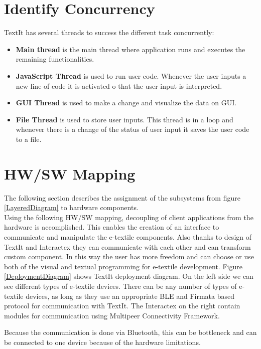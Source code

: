 \section{Identify Concurrency}
TextIt has several threads to success the different task concurrently:
\begin{itemize}
\item \textbf{Main thread} is the main thread where application runs and executes the remaining functionalities. 
\item \textbf{JavaScript Thread} is used to run user code. Whenever the user inputs a new line of code it is activated o that the user input is interpreted. 
\item \textbf{GUI Thread} is used to make a change and visualize the data on GUI.
\item \textbf{File Thread} is used to store user inputs. This thread is in a loop and whenever there is a change of the status of user input it saves the user code to a file.
\end{itemize}


\section{HW/SW Mapping}
The following section describes the assignment of the subsystems from figure \ref{LayeredDiagram} to hardware components. \\

Using the following HW/SW mapping, decoupling of client applications from the hardware is accomplished. This enables the creation of an interface to communicate and manipulate the e-textile components. Also thanks to design of TextIt and Interactex they can communicate with each other and can transform custom component. In this way the user has more freedom and can choose or use both of the visual and textual programming for e-textile development. Figure \ref{DeploymentDiagram} shows TextIt deployment diagram. On the left side we can see different types of e-textile devices. There can be any number of types of e-textile devices, as long as they use an appropriate BLE and Firmata based protocol for communication with TextIt. The Interactex on the right contain modules for communication using Multipeer Connectivity Framework. \\


Because the communication is done via Bluetooth, this can be bottleneck and can be connected to one device because of the hardware limitations. 

